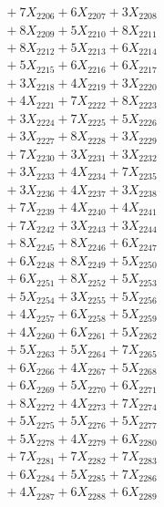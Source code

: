 \documentclass[a4paper,10pt]{article}
\begin{document}
{\begin{align}
&\;  + 7 X_{2206} + 6 X_{2207} + 3 X_{2208} \\[0.3ex]
&\;  + 8 X_{2209} + 5 X_{2210} + 8 X_{2211} \\[0.3ex]
&\;  + 8 X_{2212} + 5 X_{2213} + 6 X_{2214} \\[0.3ex]
&\;  + 5 X_{2215} + 6 X_{2216} + 6 X_{2217} \\[0.3ex]
&\;  + 3 X_{2218} + 4 X_{2219} + 3 X_{2220} \\[0.3ex]
&\;  + 4 X_{2221} + 7 X_{2222} + 8 X_{2223} \\[0.3ex]
&\;  + 3 X_{2224} + 7 X_{2225} + 5 X_{2226} \\[0.3ex]
&\;  + 3 X_{2227} + 8 X_{2228} + 3 X_{2229} \\[0.5ex]\allowbreak
&\;  + 7 X_{2230} + 3 X_{2231} + 3 X_{2232} \\[0.3ex]
&\;  + 3 X_{2233} + 4 X_{2234} + 7 X_{2235} \\[0.3ex]
&\;  + 3 X_{2236} + 4 X_{2237} + 3 X_{2238} \\[0.3ex]
&\;  + 7 X_{2239} + 4 X_{2240} + 4 X_{2241} \\[0.3ex]
&\;  + 7 X_{2242} + 3 X_{2243} + 3 X_{2244} \\[0.3ex]
&\;  + 8 X_{2245} + 8 X_{2246} + 6 X_{2247} \\[0.3ex]
&\;  + 6 X_{2248} + 8 X_{2249} + 5 X_{2250} \\[0.3ex]
&\;  + 6 X_{2251} + 8 X_{2252} + 5 X_{2253} \\[0.3ex]
&\;  + 5 X_{2254} + 3 X_{2255} + 5 X_{2256} \\[0.3ex]
&\;  + 4 X_{2257} + 6 X_{2258} + 5 X_{2259} \\[0.5ex]\allowbreak
&\;  + 4 X_{2260} + 6 X_{2261} + 5 X_{2262} \\[0.3ex]
&\;  + 5 X_{2263} + 5 X_{2264} + 7 X_{2265} \\[0.3ex]
&\;  + 6 X_{2266} + 4 X_{2267} + 5 X_{2268} \\[0.3ex]
&\;  + 6 X_{2269} + 5 X_{2270} + 6 X_{2271} \\[0.3ex]
&\;  + 8 X_{2272} + 4 X_{2273} + 7 X_{2274} \\[0.3ex]
&\;  + 5 X_{2275} + 5 X_{2276} + 5 X_{2277} \\[0.3ex]
&\;  + 5 X_{2278} + 4 X_{2279} + 6 X_{2280} \\[0.3ex]
&\;  + 7 X_{2281} + 7 X_{2282} + 7 X_{2283} \\[0.3ex]
&\;  + 6 X_{2284} + 5 X_{2285} + 7 X_{2286} \\[0.3ex]
&\;  + 4 X_{2287} + 6 X_{2288} + 6 X_{2289} \\[0.5ex]\allowbreak

\end{align}}
\end{document}
